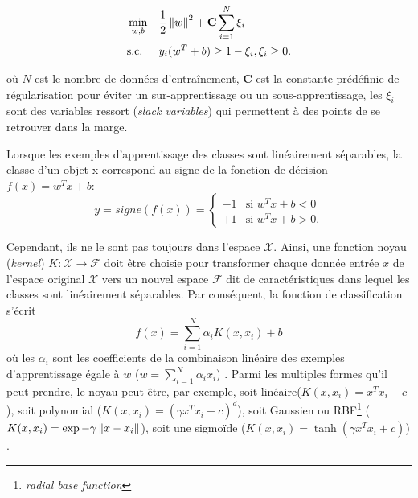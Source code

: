 \begin{equation*}
\begin{aligned}
& \mathop{\mathrm{min}}\limits\limits_{w,b}
& &\frac{1}{2}\left\lVert w\right\rVert^2 + \mathbf{C} \sum\limits^N_{i=1} \xi_i \\
& \text{s.c.}
& & y_i(w^T+b)\geq 1-\xi_i, \xi_i \geq 0.
\end{aligned}
\end{equation*}

où $N$ est le nombre de données d'entraînement, $\mathbf{C}$ est la constante prédéfinie de régularisation pour éviter un sur-apprentissage ou un sous-apprentissage, les $\xi_i$ sont des variables ressort (\textit{slack variables}) qui permettent à des points de se retrouver dans la marge. 


Lorsque les exemples d'apprentissage des classes sont linéairement séparables, la classe d'un objet x correspond au signe de la fonction de décision $f(x) = w^T x + b$:
\[
y = signe(f(x))=
\left\{ \begin{array}{ll}
-1 & \text{si }w^Tx+b<0\\
+1 & \text{si }w^Tx+b>0.
\end{array}
\right.
\]


 Cependant, ils ne le sont pas toujours dans l'espace $\mathcal{X}$. Ainsi, une fonction \og noyau \fg{} (\textit{kernel}) $K: \mathcal{X} \longrightarrow \mathcal{F}$ doit être choisie pour transformer chaque donnée entrée $x$ de l'espace original $\mathcal{X}$ vers un nouvel espace $\mathcal{F}$ dit de caractéristiques dans lequel les classes sont linéairement séparables. Par conséquent, la fonction de classification s'écrit \[f(x) = \sum\limits_{i=1}^N \alpha_i K(x,x_i) + b\] où les $\alpha_i$ sont les coefficients de la combinaison linéaire des exemples d'apprentissage égale à $w$ ($w = \sum\limits_{i=1}^N\alpha_i x_i$) \citep{Ben-Hur2010svm}. Parmi les multiples formes qu'il peut prendre, le noyau peut être, par exemple, soit linéaire($K(x,x_i) = x^Tx_i + c$), soit polynomial ($K(x,x_i) = (\gamma x^Tx_i + c)^d$), soit Gaussien ou RBF\footnote{\textit{radial base function}} ($K(x,x_i) = \exp{-\gamma \left\lVert x-x_i\right\rVert}$), soit une sigmoïde ($K(x,x_i) = \tanh(\gamma x^Tx_i + c)$) \citep{Amami2013PracticalModelSelectionSVM}.

